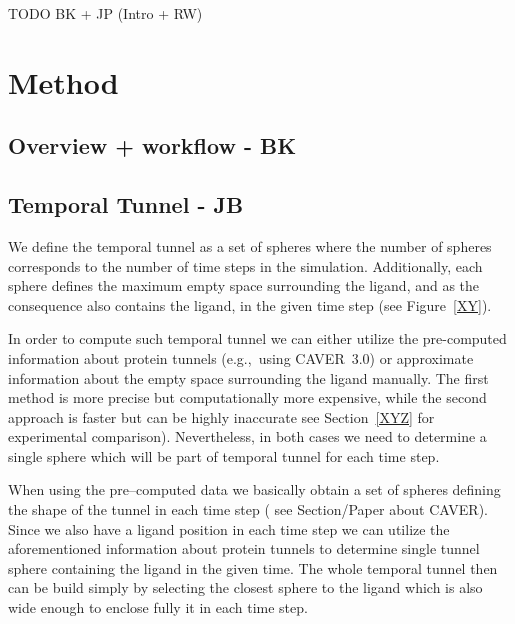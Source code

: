 \documentclass[twocolumn]{bmcart}%
\newcommand{\eg}{e.g.,~}
\begin{document}
TODO BK + JP (Intro + RW)

\section*{Method}
\subsection*{Overview + workflow - BK}

\subsection*{Temporal Tunnel - JB}
\label{Sec:TemporalTunnel}


We define the temporal tunnel as a set of spheres where the number of spheres corresponds to the number of time steps in the simulation.
Additionally, each sphere defines the maximum empty space surrounding the ligand, and as the consequence also contains the ligand, in the given time step {\color{red}(see Figure~\ref{XY})}.

In order to compute such temporal tunnel we can either utilize the pre-computed information about protein tunnels (\eg using CAVER~3.0) or approximate information about the empty space surrounding the ligand manually. 
The first method is more precise but computationally more expensive, while the second approach is faster but {\color{red}can be highly inaccurate} {\color{red}see Section~\ref{XYZ} for experimental comparison)}. 
Nevertheless, in both cases we need to determine a single sphere which will be part of temporal tunnel for each time step.

When using the pre--computed data we basically obtain a set of spheres defining the shape of the tunnel in each time step ({\color{red} see Section/Paper about CAVER}). 
Since we also have a ligand position  in each time step we can utilize the aforementioned information about protein tunnels to determine single tunnel sphere containing the ligand in the given time. 
The whole temporal tunnel then can be build simply by selecting the closest sphere to the ligand which is also wide enough  to enclose fully it in each time step. 
\end{document}
